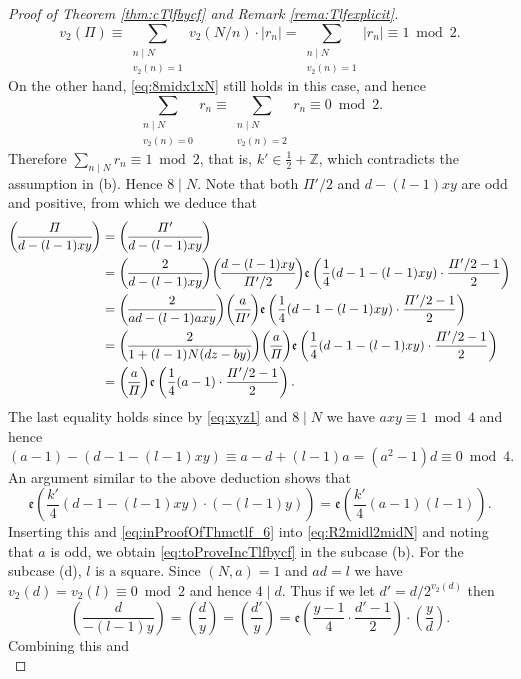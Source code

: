\documentclass[12pt]{amsart}
\numberwithin{equation}{section}
\theoremstyle{plain}
\theoremstyle{definition}
\theoremstyle{remark}
\newcommand\twoscript[2]{\substack{{#1} \\ {#2}}}
\newcommand\legendre[2]{\genfrac{(}{)}{}{}{#1}{#2}}
\newcommand*\abs[1]{\lvert#1\rvert}
\newcommand\etp[1]{\mathfrak{e}\left(#1\right)}
\newcommand\numZ{\mathbb{Z}}
\begin{document}
\begin{proof}[Proof of Theorem \ref{thm:cTlfbycf} and Remark \ref{rema:Tlfexplicit}]
\begin{equation*}
v_2(\varPi)\equiv\sum_{\twoscript{n\mid N}{v_2(n)=1}}v_2(N/n)\cdot\abs{r_{n}}=\sum_{\twoscript{n\mid N}{v_2(n)=1}}\abs{r_n}\equiv1\bmod{2}.
\end{equation*}
On the other hand, \eqref{eq:8midx1xN} still holds in this case, and hence
\begin{equation*}
\sum_{\twoscript{n\mid N}{v_2(n)=0}}r_n\equiv\sum_{\twoscript{n\mid N}{v_2(n)=2}}r_n\equiv0\bmod{2}.
\end{equation*}
Therefore $\sum_{n\mid N}r_n\equiv1\bmod{2}$, that is, $k'\in\frac{1}{2}+\numZ$, which contradicts the assumption in (b). Hence $8\mid N$. Note that both $\varPi'/2$ and $d-(l-1)xy$ are odd and positive, from which we deduce that
\begin{align}
\legendre{\varPi}{d-(l-1)xy}&=\legendre{\varPi'}{d-(l-1)xy}\notag\\
&=\legendre{2}{d-(l-1)xy}\legendre{d-(l-1)xy}{\varPi'/2}\etp{\frac{1}{4}(d-1-(l-1)xy)\cdot\frac{\varPi'/2-1}{2}}\notag\\
&=\legendre{2}{ad-(l-1)axy}\legendre{a}{\varPi'}\etp{\frac{1}{4}(d-1-(l-1)xy)\cdot\frac{\varPi'/2-1}{2}}\notag\\
&=\legendre{2}{1+(l-1)N(dz-by)}\legendre{a}{\varPi}\etp{\frac{1}{4}(d-1-(l-1)xy)\cdot\frac{\varPi'/2-1}{2}}\notag\\
&=\legendre{a}{\varPi}\etp{\frac{1}{4}(a-1)\cdot\frac{\varPi'/2-1}{2}}.\label{eq:inProofOfThmctlf_6}
\end{align}
The last equality holds since by \eqref{eq:xyz1} and $8\mid N$ we have $axy\equiv1\bmod{4}$ and hence
\begin{equation*}
(a-1)-(d-1-(l-1)xy)\equiv a-d+(l-1)a=(a^2-1)d\equiv0\bmod{4}.
\end{equation*}
An argument similar to the above deduction shows that
$$
\etp{\frac{k'}{4}(d-1-(l-1)xy)\cdot(-(l-1)y)}=\etp{\frac{k'}{4}(a-1)(l-1)}.
$$
Inserting this and \eqref{eq:inProofOfThmctlf_6} into \eqref{eq:R2midl2midN} and noting that $a$ is odd, we obtain \eqref{eq:toProveIncTlfbycf} in the subcase (b). For the subcase (d), $l$ is a square. Since $(N,a)=1$ and $ad=l$ we have $v_2(d)=v_2(l)\equiv0\bmod{2}$ and hence $4\mid d$. Thus if we let $d'=d/2^{v_2(d)}$ then
\begin{equation*}
\legendre{d}{-(l-1)y}=\legendre{d}{y}=\legendre{d'}{y}=\etp{\frac{y-1}{4}\cdot\frac{d'-1}{2}}\cdot\legendre{y}{d}.
\end{equation*}
Combining this and
\begin{equation*}

\end{equation*}
\end{proof}
\end{document}
